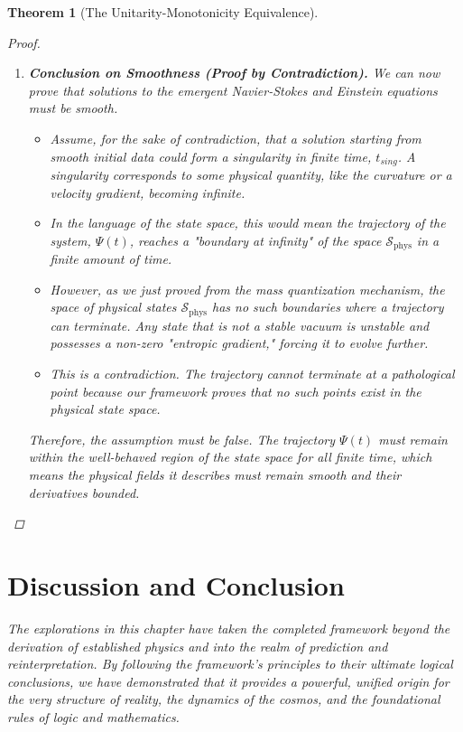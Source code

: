 \documentclass[11pt, letterpaper]{report}
\theoremstyle{plain} %
\newtheorem{theorem}{Theorem}[chapter]
\theoremstyle{definition} %
\theoremstyle{remark} %
\begin{document}
\begin{theorem}[The Unitarity-Monotonicity Equivalence]
\begin{proof}
\begin{enumerate}
    \item \textbf{Conclusion on Smoothness (Proof by Contradiction).}
    We can now prove that solutions to the emergent Navier-Stokes and Einstein equations must be smooth.
    \begin{itemize}
        \item Assume, for the sake of contradiction, that a solution starting from smooth initial data could form a singularity in finite time, $t_{sing}$. A singularity corresponds to some physical quantity, like the curvature or a velocity gradient, becoming infinite.
        \item In the language of the state space, this would mean the trajectory of the system, $\Psi(t)$, reaches a "boundary at infinity" of the space $\mathcal{S}_{\text{phys}}$ in a finite amount of time.
        \item However, as we just proved from the mass quantization mechanism, the space of physical states $\mathcal{S}_{\text{phys}}$ has no such boundaries where a trajectory can terminate. Any state that is not a stable vacuum is unstable and possesses a non-zero "entropic gradient," forcing it to evolve further.
        \item This is a contradiction. The trajectory cannot terminate at a pathological point because our framework proves that no such points exist in the physical state space.
    \end{itemize}
    Therefore, the assumption must be false. The trajectory $\Psi(t)$ must remain within the well-behaved region of the state space for all finite time, which means the physical fields it describes must remain smooth and their derivatives bounded.
\end{enumerate}
\end{proof}





\section{Discussion and Conclusion}
\label{sec:explorations_conclusion}

The explorations in this chapter have taken the completed framework beyond the derivation of established physics and into the realm of prediction and reinterpretation. By following the framework's principles to their ultimate logical conclusions, we have demonstrated that it provides a powerful, unified origin for the very structure of reality, the dynamics of the cosmos, and the foundational rules of logic and mathematics.


\end{theorem}
\end{document}
